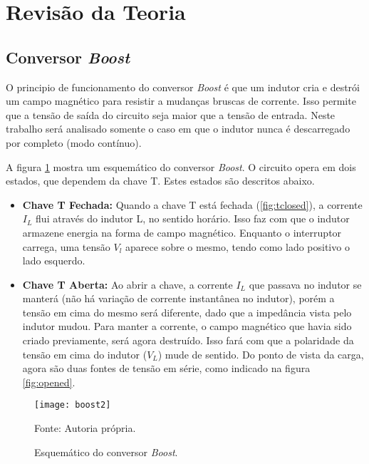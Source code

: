 \newpage
\section{Revisão da Teoria}

\subsection{Conversor \textit{Boost}}

O principio de funcionamento do conversor \textit{Boost} é que um indutor cria e destrói um campo magnético para resistir a mudanças bruscas de corrente. Isso permite que a tensão de saída do circuito seja maior que a tensão de entrada. Neste trabalho será analisado somente o caso em que o indutor nunca é descarregado por completo (modo contínuo).

A figura \ref{fig:boost2} mostra um esquemático do conversor \textit{Boost}. O circuito opera em dois estados, que dependem da chave T. Estes estados são descritos abaixo.

\begin{itemize}
    \item \textbf{Chave T Fechada:} Quando a chave T está fechada (\ref{fig:tclosed}), a corrente $I_L$ flui através do indutor L, no sentido horário. Isso faz com que o indutor armazene energia na forma de campo magnético. Enquanto o interruptor carrega, uma tensão $V_l$ aparece sobre o mesmo, tendo como lado positivo o lado esquerdo.
    
    \item \textbf{Chave T Aberta:} Ao abrir a chave, a corrente $I_L$ que passava no indutor se manterá (não há variação de corrente instantânea no indutor), porém a tensão em cima do mesmo será diferente, dado que a impedância vista pelo indutor mudou. Para manter a corrente, o campo magnético que havia sido criado previamente, será agora destruído. Isso fará com que a polaridade da tensão em cima do indutor ($V_L$) mude de sentido. Do ponto de vista da carga, agora são duas fontes de tensão em série, como indicado na figura \ref{fig:opened}.
\end{itemize}


\begin{figure}[H]
    \centering
    \caption{Esquemático do conversor \textit{Boost}.}
    \texttt{[image: boost2]}
    \label{fig:boost2}
    
    \small Fonte: Autoria própria.
\end{figure}

